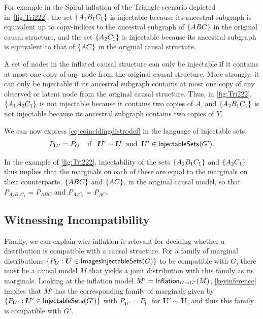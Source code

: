 \documentclass[aps,english,10pt,superscriptaddress,onecolumn,twoside,longbibliography,pra,floatfix,fleqn,nofootinbib]{revtex4-1}
\theoremstyle{definition}
\newcounter{example}[section]
\newcommand{\SmallNamedFunction}[3][]{\operatorname{\mathsf{#2}}_{#1}\parenths{#3}}
\DeclarePairedDelimiter{\parenths}{\lparen}{\rparen}
\DeclarePairedDelimiter{\braces}{\lbrace}{\rbrace}
\newcommand{\brackets}[1]{\braces*{#1}}
\begin{document}
For example in the Spiral inflation of the Triangle scenario depicted in~\cref{fig:Tri222}, the set $\brackets{A_1 B_1 C_1}$ is injectable because its ancestral subgraph is equivalent up to copy-indices to the ancestral subgraph of $\brackets{A B C}$ in the original causal structure, and the set $\brackets{A_2 C_1}$ is injectable because its ancestral subgraph is equivalent to that of $\brackets{ A C}$ in the original causal structure.

A set of nodes in the inflated causal structure can only be injectable if it contains at most one copy of any node from the original causal structure. More strongly, it can only be injectable if its ancestral subgraph contains at most one copy of any observed or latent node from the original causal structure.  
Thus, in \cref{fig:Tri222}, $\brackets{A_1 A_2 C_1}$ is not injectable because it contains two copies of $A$, and $\brackets{A_2 B_1 C_1}$ is not injectable because its ancestral subgraph contains two copies of $Y$. 

We can now express \cref{eq:coincidingdistrodef} in the language of injectable sets,
\begin{align}\label{keyinference}
P_{\bm{U}'}=P_{\bm{U}}\quad\text{if }  \;\; \bm{U}' \sim \bm{U}\;\; \text{and} \;\; \bm{U}'\in\SmallNamedFunction{InjectableSets}{G'}.
\end{align}

In the example of \cref{fig:Tri222}, injectability of the sets $\brackets{A_1 B_1 C_1}$ and $\brackets{A_2 C_1}$ thus implies that the marginals on each of these are equal to the marginals on their counterparts, $\brackets{A B C}$ and $\brackets{A C}$, in the original causal model, so that $P_{A_1 B_1 C_1} = P_{A B C}$ and $P_{A_2 C_1} = P_{A C}$.

\subsection{Witnessing Incompatibility}
\label{subsec:witnessingincompat}

Finally, we can explain why inflation is relevant for deciding whether a distribution is compatible with a causal structure.  For a family of marginal distributions $\{ P_{\bm{U}} : \bm{U} \in \SmallNamedFunction{ImagesInjectableSets}{G}\}$ to be compatible with $G$, there must be a causal model $M$ that yields a joint distribution with this family as its marginals. Looking at the inflation model $M' = \SmallNamedFunction[G\to G']{Inflation}{M}$, \cref{keyinference} implies that $M'$ has the corresponding family of marginals given by $\{ P_{\bm{U}'} : \bm{U}' \in \SmallNamedFunction{InjectableSets}{G'}\}$ with $P_{\bm{U}'} = P_{\bm{U}}$ for $\bm{U}'\sim\bm{U}$, and thus this family is compatible with $G'$.
\end{document}
